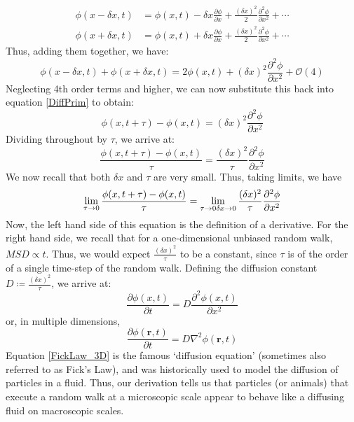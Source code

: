 \begin{align*}
	\phi(x-\delta x,t) &= \phi(x,t) - \delta x \frac{\partial\phi}{\partial x} + \frac{(\delta x)^2}{2}\frac{\partial^2\phi}{\partial x^2} + \cdots\\
	\phi(x+\delta x,t) &= \phi(x,t) + \delta x \frac{\partial\phi}{\partial x} + \frac{(\delta x)^2}{2}\frac{\partial^2\phi}{\partial x^2} + \cdots
\end{align*}
Thus, adding them together, we have:
\begin{equation*}
	\phi(x-\delta x,t) + \phi(x+\delta x,t) = 2\phi(x,t) + (\delta x)^2\frac{\partial^2\phi}{\partial x^2} + \mathcal{O}(4)
\end{equation*}
Neglecting 4th order terms and higher, we can now substitute this back into equation \eqref{DiffPrim} to obtain:
\begin{equation*}
	\phi(x,t+\tau) - \phi(x,t) = (\delta x)^2\frac{\partial^2\phi}{\partial x^2}
\end{equation*}
Dividing throughout by $\tau$, we arrive at:
\begin{equation*}
\frac{\phi(x,t+\tau) - \phi(x,t)}{\tau} = \frac{(\delta x)^2}{\tau}\frac{\partial^2\phi}{\partial x^2}
\end{equation*}
We now recall that both $\delta x$ and $\tau$ are very small. Thus, taking limits, we have
\begin{equation*}
	\lim\limits_{\tau \to 0} \frac{\phi(x,t+\tau) - \phi(x,t)}{\tau} = \lim\limits_{\tau \to 0\\\delta x \to 0}  \frac{(\delta x)^2}{\tau}\frac{\partial^2\phi}{\partial x^2}
\end{equation*}
Now, the left hand side of this equation is the definition of a derivative. For the right hand side, we recall that for a one-dimensional unbiased random walk, $MSD \propto t$. Thus, we would expect $\frac{(\delta x)^2}{\tau}$ to be a constant, since $\tau$ is of the order of a single time-step of the random walk. Defining the diffusion constant $D \coloneqq \frac{(\delta x)^2}{\tau}$, we arrive at:
\begin{equation}
	\label{FickLaw_1D}
	\frac{\partial \phi(x,t)}{\partial t} = D\frac{\partial^2\phi(x,t)}{\partial x^2}
\end{equation}
or, in multiple dimensions,
\begin{equation}
	\label{FickLaw_3D}
	\boxed{\frac{\partial \phi(\mathbf{r},t)}{\partial t} = D\nabla^2\phi(\mathbf{r},t)}
\end{equation}
Equation \eqref{FickLaw_3D} is the famous `diffusion equation' (sometimes also referred to as Fick's Law), and was historically used to model the diffusion of particles in a fluid. Thus, our derivation tells us that particles (or animals) that execute a random walk at a microscopic scale appear to behave like a diffusing fluid on macroscopic scales.

